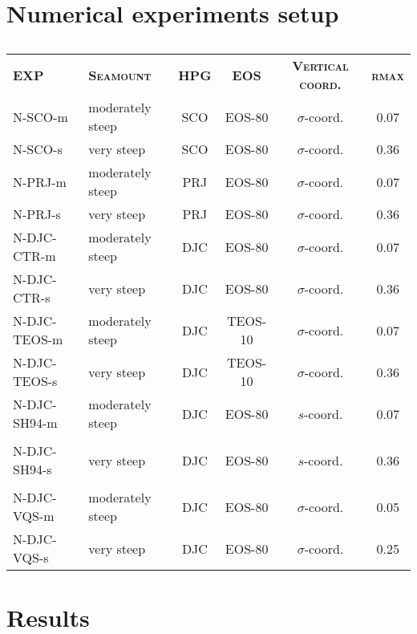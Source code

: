 \documentclass[authoryear]{elsarticle}
\begin{document}
\section{Numerical experiments setup} \label{exp_setup}
\begin{table}[htp]
	\centering
	\hspace{-7cm}
	\begin{scriptsize}
		\begin{tabular}{llcccc}
			\cmidrule[0.5pt]{1-6}
			\textsc{\textbf{EXP}} & \textsc{\textbf{Seamount}} & \textsc{\textbf{HPG}} & \textsc{\textbf{EOS}} & \textsc{\textbf{Vertical coord.}} & \textsc{\textbf{rmax}} \\
			\cmidrule[0.5pt]{1-6}
			N-SCO-m      & moderately steep & SCO & EOS-80  & $\sigma$-coord. & 0.07 \\
			N-SCO-s      & very steep       & SCO & EOS-80  & $\sigma$-coord. & 0.36 \\
			N-PRJ-m      & moderately steep & PRJ & EOS-80  & $\sigma$-coord. & 0.07 \\
			N-PRJ-s      & very steep       & PRJ & EOS-80  & $\sigma$-coord. & 0.36 \\
			N-DJC-CTR-m  & moderately steep & DJC & EOS-80  & $\sigma$-coord. & 0.07 \\
			N-DJC-CTR-s  & very steep       & DJC & EOS-80  & $\sigma$-coord. & 0.36 \\
			N-DJC-TEOS-m & moderately steep & DJC & TEOS-10 & $\sigma$-coord. & 0.07 \\
			N-DJC-TEOS-s & very steep       & DJC & TEOS-10 & $\sigma$-coord. & 0.36 \\
			N-DJC-SH94-m & moderately steep & DJC & EOS-80  & $s$-coord.      & 0.07 \\
			             &                  &     &         & \cite{Song1994}  &      \\
			N-DJC-SH94-s & very steep       & DJC & EOS-80  & $s$-coord.      & 0.36 \\
			             &                  &     &         & \cite{Song1994}  &      \\	
			N-DJC-VQS-m  & moderately steep & DJC & EOS-80  & $\sigma$-coord. & 0.05 \\
			N-DJC-VQS-s  & very steep       & DJC & EOS-80  & $\sigma$-coord. & 0.25 \\              
			\cmidrule[.5pt]{1-6}
		\end{tabular}
	\end{scriptsize}
	\hspace{-7cm}
	\caption{ }
\end{table}

\section{Results} \label{results} 




\end{document}
